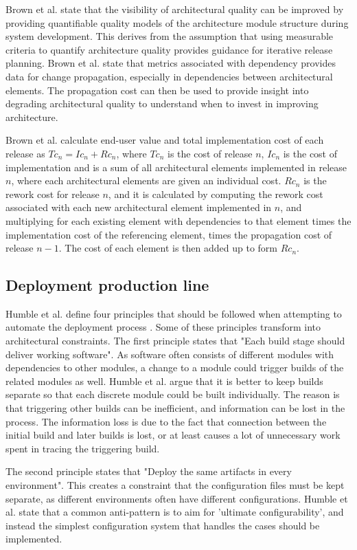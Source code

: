 \documentclass[conference]{IEEEtran}
\begin{document}
Brown et al. state that the visibility of architectural quality can be improved by providing quantifiable quality models of the architecture module structure during system development. This derives from the assumption that using measurable criteria to quantify architecture quality provides guidance for iterative release planning. Brown et al. state that metrics associated with dependency provides data for change propagation, especially in dependencies between architectural elements. The propagation cost can then be used to provide insight into degrading architectural quality to understand when to invest in improving architecture.

Brown et al. calculate end-user value and total implementation cost of each release as $Tc_n = Ic_n + Rc_n$, where $Tc_n$ is the cost of release $n$, $Ic_n$ is the cost of implementation and is a sum of all architectural elements implemented in release $n$, where each architectural elements are given an individual cost. $Rc_n$ is the rework cost for release $n$, and it is calculated by computing the rework cost associated with each new architectural element implemented in $n$, and multiplying for each existing element with dependencies to that element times the implementation cost of the referencing element, times the propagation cost of release $n-1$. The cost of each element is then added up to form $Rc_n$.

\subsection{Deployment production line}

Humble et al. define four principles that should be followed when attempting to automate the deployment process \cite{humble2006deployment}. Some of these principles transform into architectural constraints. The first principle states that "Each build stage should deliver working software". As software often consists of different modules with dependencies to other modules, a change to a module could trigger builds of the related modules as well. Humble et al. argue that it is better to keep builds separate so that each discrete module could be built individually. The reason is that triggering other builds can be inefficient, and information can be lost in the process. The information loss is due to the fact that connection between the initial build and later builds is lost, or at least causes a lot of unnecessary work spent in tracing the triggering build. 

The second principle states that "Deploy the same artifacts in every environment". This creates a constraint that the configuration files must be kept separate, as different environments often have different configurations. Humble et al. state that a common anti-pattern is to aim for 'ultimate configurability', and instead the simplest configuration system that handles the cases should be implemented.
\end{document}
